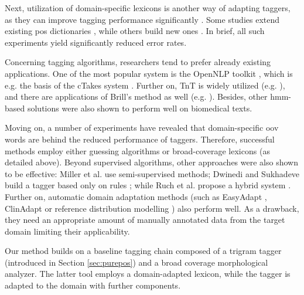 Next, utilization of domain-specific lexicons is another way of adapting taggers, as they can improve tagging performance significantly \cite{coden2005domain,ruch2000minimal}. 
Some studies extend existing \acrshort{pos} dictionaries \cite{divita2006dtagger}, while others build new ones \cite{Smith2006}. 
In brief, all such experiments yield significantly reduced error rates. 

Concerning tagging algorithms, researchers tend to prefer already existing applications. 
One of the most popular system is the OpenNLP toolkit \cite{Baldridge2002}, which is e.g. the basis of the cTakes system \cite{Savova2010}.
Further on, TnT \cite{Brants2000} is widely utilized (e.g. \cite{hahn2004tagging,Savova2010}), and there are applications of Brill’s method \cite{Brill1992} as well (e.g. \cite{pestian2004development}). 
Besides, other \acrshort{hmm}-based solutions were also shown to perform well \cite{barrett2011token,coden2005domain,divita2006dtagger,hahn2004tagging,pakhomov2006developing,rost2008lessons,ruch2000minimal} on biomedical texts. 

Moving on, a number of experiments have revealed \cite{ferraro2013improving,ruch2000minimal,Smith2006} that domain-specific \acrshort{oov} words are behind the reduced performance of taggers. 
Therefore, successful methods employ either guessing algorithms \cite{barrett2011token,divita2006dtagger,rost2008lessons,ruch2000minimal,Smith2006} or broad-coverage lexicons (as detailed above). 
Beyond supervised algorithms, other approaches were also shown to be effective: Miller et al. \cite{miller2007building} use semi-supervised methods;
Dwinedi and Sukhadeve build a tagger based only on rules \cite{dwivedi8rule}; while Ruch et al. propose a hybrid system \cite{ruch2000minimal}. 
Further on, automatic domain adaptation methods (such as EasyAdapt \cite{daume2007frustratingly}, ClinAdapt \cite{ferraro2013improving} 
or reference distribution modelling  \cite{tateisi2006subdomain}) also perform well. As a drawback, they need an appropriate amount of manually annotated data from the target domain limiting their applicability. 

Our method builds on a baseline tagging chain composed of a trigram tagger (introduced in Section \ref{sec:purepos}) and a broad coverage morphological analyzer. 
The latter tool employs a domain-adapted lexicon, while the tagger is adapted to the domain with further components.

